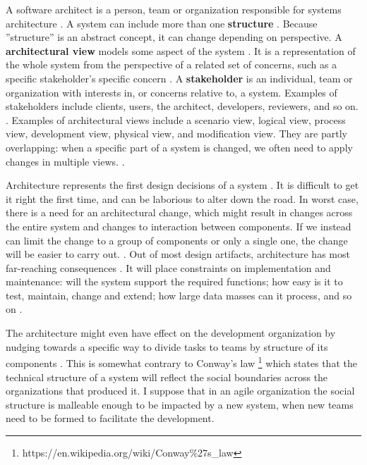 \documentclass[utf8,english]{gradu3}
\begin{document}
A software architect is a person, team or organization responsible for systems architecture \parencite[3]{IEEE42010}.
A system can include more than one \textbf{structure} \parencite[23]{Bass1998}. Because
''structure'' is an abstract concept, it can change depending on perspective. A
\textbf{architectural view} models some aspect of the system
\parencite{Koskimies2005}. It is a representation of the whole system from the
perspective of a related set of concerns, such as a specific stakeholder's
specific concern \parencite[3]{IEEE42010}. A \textbf{stakeholder} is an
individual, team or organization with interests in, or concerns relative to, a
system. Examples of stakeholders include clients, users, the architect, developers, reviewers,
and so on. \parencite[3]{IEEE42010}. Examples of architectural views include a
scenario view, logical view, process view, development view, physical view, and
modification view. They are partly overlapping: when a specific part of a system
is changed, we often need to apply changes in multiple views.
\parencite{Koskimies2005}.

Architecture represents the first design decisions of a system
\parencite{Bass1998}. It is difficult to get it right the first time, and can be
laborious to alter down the road. In worst case, there is a need for an
architectural change, which might result in changes across the entire system and
changes to interaction between components. If we instead can limit the change to
a group of components or only a single one, the change will be easier to carry
out. \parencite[31]{Bass1998}. Out of most design artifacts, architecture has most far-reaching consequences
\parencite[31]{Bass1998}. It will place constraints on implementation and
maintenance: will the system support the required functions; how easy is it to
test, maintain, change and extend; how large data masses can it process, and so
on \parencite{Koskimies2005}.

The architecture might even have effect on the development organization by
nudging towards a specific way to divide tasks to teams by structure of its
components \parencite[31]{Bass1998}. This is somewhat contrary to Conway's law
\footnote{https://en.wikipedia.org/wiki/Conway\%27s\_law} which states that the
technical structure of a system will reflect the social boundaries across the
organizations that produced it. I suppose that in an agile organization the
social structure is malleable enough to be impacted by a new system, when new
teams need to be formed to facilitate the development.
\end{document}
